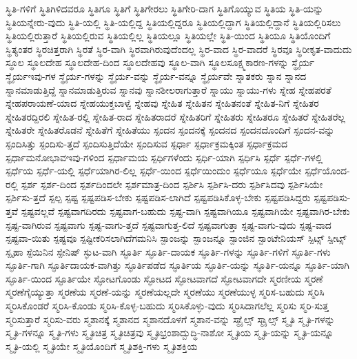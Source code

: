 {ಸ್ಥಿತಿ-ಗಳಿಗೆ
ಸ್ಥಿತಿಗಿಳಿದವರೂ
ಸ್ಥಿತಿಗೂ
ಸ್ಥಿತಿಗೆ
ಸ್ಥಿತಿಗೇರಲು
ಸ್ಥಿತಿಗೇರಿ-ದಾಗ
ಸ್ಥಿತಿಗೊಯ್ಯುವ
ಸ್ಥಿತಿಯ
ಸ್ಥಿತಿ-ಯನ್ನು
ಸ್ಥಿತಿಯನ್ನೇರು-ವುದು
ಸ್ಥಿತಿ-ಯಲ್ಲಿ
ಸ್ಥಿತಿ-ಯಲ್ಲಿದ್ದ
ಸ್ಥಿತಿಯಲ್ಲಿದ್ದರೂ
ಸ್ಥಿತಿಯಲ್ಲಿದ್ದಾಗ
ಸ್ಥಿತಿಯಲ್ಲಿದ್ದಾನೆ
ಸ್ಥಿತಿಯಲ್ಲಿರಿಸಲು
ಸ್ಥಿತಿಯಲ್ಲಿರುತ್ತಾರೆ
ಸ್ಥಿತಿಯಲ್ಲಿರುವ
ಸ್ಥಿತಿಯಲ್ಲಿಲ್ಲ
ಸ್ಥಿತಿಯಲ್ಲೂ
ಸ್ಥಿತಿಯಲ್ಲೇ
ಸ್ಥಿತಿ-ಯಿಂದ
ಸ್ಥಿತಿಯೂ
ಸ್ಥಿತಿಯೊಂದಿಗೆ
ಸ್ಥಿತ್ಯಂತರ
ಸ್ಥಿರಚಿತ್ತರಾಗಿ
ಸ್ಥಿರತೆ
ಸ್ಥಿರ-ವಾಗಿ
ಸ್ಥಿರವಾಗಿರುವುದೆಂದಲ್ಲ
ಸ್ಥಿರ-ವಾದ
ಸ್ಥಿರ-ವಾದರೆ
ಸ್ಥಿರವೂ
ಸ್ಥಿರೀಕೃತ-ವಾದುದು
ಸ್ಥೂಲ
ಸ್ಥೂಲದೇಹ
ಸ್ಥೂಲದೇಹ-ದಿಂದ
ಸ್ಥೂಲದೇಹವು
ಸ್ಥೂಲ-ವಾಗಿ
ಸ್ಥೂಲಸೂಕ್ಷ್ಮಕಾರಣ-ಗಳನ್ನು
ಸ್ಥೈರ್ಯ
ಸ್ಥೈರ್ಯಇವು-ಗಳ
ಸ್ಥೈರ್ಯ-ಗಳನ್ನು
ಸ್ಥೈರ್ಯ-ವನ್ನು
ಸ್ಥೈರ್ಯ-ವನ್ನೂ
ಸ್ಥೈರ್ಯವೇ
ಸ್ನಾತಕರು
ಸ್ನಾನ
ಸ್ನಾನದ
ಸ್ನಾನಮಾಡುತ್ತಿದ್ದೆ
ಸ್ನಾನಮಾಡುತ್ತಿರುವ
ಸ್ನಾನವು
ಸ್ನಾನಶೀಲರಾಗುತ್ತಾರೆ
ಸ್ನಾಯು
ಸ್ನಾಯು-ಗಳು
ಸ್ನೇಹ
ಸ್ನೇಹಪರತೆ
ಸ್ನೇಹಪರಾಯಣೆ-ಯಾದ
ಸ್ನೇಹಯುಕ್ತಬಾಳ್ವೆ
ಸ್ನೇಹವು
ಸ್ನೇಹಿತ
ಸ್ನೇಹಿತನ
ಸ್ನೇಹಿತನಂತೆ
ಸ್ನೇಹಿತ-ನಿಗೆ
ಸ್ನೇಹಿತರ
ಸ್ನೇಹಿತರದ್ದಿರಲಿ
ಸ್ನೇಹಿತ-ರಲ್ಲಿ
ಸ್ನೇಹಿತ-ರಾದ
ಸ್ನೇಹಿತರಾದರೆ
ಸ್ನೇಹಿತರಿಗೆ
ಸ್ನೇಹಿತರು
ಸ್ನೇಹಿತರೂ
ಸ್ನೇಹಿತರೆ
ಸ್ನೇಹಿತರೆಲ್ಲ
ಸ್ನೇಹಿತರೇ
ಸ್ನೇಹಿತರೊಡನೆ
ಸ್ನೇಹಿತೆಗೆ
ಸ್ನೇಹಿತೆಯು
ಸ್ಪಂದನ
ಸ್ಪಂದನಕ್ಕೆ
ಸ್ಪಂದನದ
ಸ್ಪಂದನದೊಂದಿಗೆ
ಸ್ಪಂದನ-ವನ್ನು
ಸ್ಪಂದಿಸಿತ್ತು
ಸ್ಪಂದಿಸು-ತ್ತದೆ
ಸ್ಪಂದಿಸುತ್ತಿದೆಯೇ
ಸ್ಪಂದಿಸುವ
ಸ್ಪರ್ಧಾ
ಸ್ಪರ್ಧಾಕ್ರಮಕ್ಕಿಂತ
ಸ್ಪರ್ಧಾಕ್ರಮದ
ಸ್ಪರ್ಧಾಮನೋಭಾವಇವು-ಗಳಿಂದ
ಸ್ಪರ್ಧಾಮಯ
ಸ್ಪರ್ಧಿಗಳೆಂದು
ಸ್ಪರ್ಧಿ-ಯಾಗಿ
ಸ್ಪರ್ಧಿಸಿ
ಸ್ಪರ್ಧೆ
ಸ್ಪರ್ಧೆ-ಗಳಲ್ಲಿ
ಸ್ಪರ್ಧೆಯ
ಸ್ಪರ್ಧೆ-ಯಲ್ಲಿ
ಸ್ಪರ್ಧೆಯಾಗಿರ-ಲಿಲ್ಲ
ಸ್ಪರ್ಧೆ-ಯಿಂದ
ಸ್ಪರ್ಧೆಯಿಂದುಂ
ಸ್ಪರ್ಧೆಯೂ
ಸ್ಪರ್ಧೆಯೇ
ಸ್ಪರ್ಧೆಯೊಂದ-ರಲ್ಲಿ
ಸ್ಪರ್ಶ
ಸ್ಪರ್ಶ-ದಿಂದ
ಸ್ಪರ್ಶದಿಂದಲೇ
ಸ್ಪರ್ಶಮಾತ್ರ-ದಿಂದ
ಸ್ಪರ್ಶಿಸಿ
ಸ್ಪರ್ಶಿಸಿ-ದರು
ಸ್ಪರ್ಶಿಸಿದವು
ಸ್ಪರ್ಶಿಸಿಯೇ
ಸ್ಪರ್ಶಿಸು-ತ್ತದೆ
ಸ್ಪಲ್ಪ
ಸ್ಪಷ್ಟ
ಸ್ಪಷ್ಟಪಡಿಸ-ಬೇಕು
ಸ್ಪಷ್ಟಪಡಿಸ-ಲಾಗಿದೆ
ಸ್ಪಷ್ಟಪಡಿಸಿಕೊಳ್ಳ-ಬೇಕು
ಸ್ಪಷ್ಟಪಡಿಸಿದ್ದರು
ಸ್ಪಷ್ಟಪಡಿಸು-ತ್ತವೆ
ಸ್ಪಷ್ಟವಲ್ಲವೆ
ಸ್ಪಷ್ಟವಾಗದಿರದು
ಸ್ಪಷ್ಟವಾಗ-ಬಹುದು
ಸ್ಪಷ್ಟ-ವಾಗಿ
ಸ್ಪಷ್ಟವಾಗಿಯೂ
ಸ್ಪಷ್ಟವಾಗಿಯೇ
ಸ್ಪಷ್ಟವಾಗಿರ-ಬೇಕು
ಸ್ಪಷ್ಟ-ವಾಗಿರುವ
ಸ್ಪಷ್ಟವಾಗು
ಸ್ಪಷ್ಟ-ವಾಗು-ತ್ತದೆ
ಸ್ಪಷ್ಟವಾಗುತ್ತ-ಲಿದೆ
ಸ್ಪಷ್ಟವಾಗುತ್ತಾ
ಸ್ಪಷ್ಟ-ವಾಗು-ವುದು
ಸ್ಪಷ್ಟ-ವಾದ
ಸ್ಪಷ್ಟವಾ-ಯಿತು
ಸ್ಪಷ್ಟವೂ
ಸ್ಪಷ್ಟೀಕರಿಸಲಾಗಿದೆಗಮನಿಸಿ
ಸ್ಪಾಂಜನ್ನು
ಸ್ಪಾಂಜನ್ನೂ
ಸ್ಪಾಂಜಿನ
ಸ್ಪಾಂಟೇನಿಯಸ್
ಸ್ಪಿಟ್ಸ್
ಸ್ಪೀಟ್ಸ್
ಸ್ಪೃಹಾ
ಸ್ಪೆಯಿನಿನ
ಸ್ಪೇನಿಷ್
ಸ್ಫುಟ-ವಾಗಿ
ಸ್ಫೂರ್ತಿ
ಸ್ಫೂರ್ತಿ-ದಾಯಕ
ಸ್ಫೂರ್ತಿ-ಗಳನ್ನು
ಸ್ಫೂರ್ತಿ-ಗಳಿಗೆ
ಸ್ಫೂರ್ತಿ-ಗಳು
ಸ್ಫೂರ್ತಿ-ಗಾಗಿ
ಸ್ಫೂರ್ತಿದಾಯಕ-ವಾಗಿತ್ತು
ಸ್ಫೂರ್ತಿಪಡೆದ
ಸ್ಫೂರ್ತಿಯ
ಸ್ಫೂರ್ತಿ-ಯನ್ನು
ಸ್ಫೂರ್ತಿ-ಯನ್ನೂ
ಸ್ಫೂರ್ತಿ-ಯಾಗಿ
ಸ್ಫೂರ್ತಿ-ಯಿಂದ
ಸ್ಫೂರ್ತಿಯೇ
ಸ್ಫೋಟಗೊಂಡು
ಸ್ಫೋಟದ
ಸ್ಫೋಟವಾಗದೆ
ಸ್ಫೋಟವಾಗದೇ
ಸ್ಮರಣೀಯ
ಸ್ಮರಣೆ
ಸ್ಮರಣೆಗೈಯ್ಯುತ್ತಾ
ಸ್ಮರಣೆಯ
ಸ್ಮರಣೆ-ಯನ್ನು
ಸ್ಮರಣೆಯಲ್ಲದೇ
ಸ್ಮರಣೆಯು
ಸ್ಮರಣೆಯುಳ್ಳ
ಸ್ಮರಿಸ-ಬಹುದು
ಸ್ಮರಿಸಿ
ಸ್ಮರಿಸಿಕೊಂಡರೆ
ಸ್ಮರಿಸಿ-ಕೊಂಡು
ಸ್ಮರಿಸಿ-ಕೊಳ್ಳ-ಬಹುದು
ಸ್ಮರಿಸಿಕೊಳ್ಳು-ವುದು
ಸ್ಮರಿಸಿದಾಗಲೆಲ್ಲ
ಸ್ಮರಿಸು
ಸ್ಮರಿ-ಸುತ್ತ
ಸ್ಮರಿಸುತ್ತಾರೆ
ಸ್ಮರಿಸು-ವರು
ಸ್ಮಶಾನಕ್ಕೆ
ಸ್ಮಶಾನದ
ಸ್ಮಶಾನದೊಳಗೆ
ಸ್ಮಶಾನ-ವನ್ನು
ಸ್ಮಾೈಲ್ಸ್
ಸ್ಮಾೖಲ್ಸ್
ಸ್ಮೃತಿ
ಸ್ಮೃತಿ-ಗಳನ್ನು
ಸ್ಮೃತಿ-ಗಳನ್ನೂ
ಸ್ಮೃತಿ-ಗಳು
ಸ್ಮೃತಿಚಿತ್ರ
ಸ್ಮೃತಿಚಿತ್ರವು
ಸ್ಮೃತಿಭ್ರಂಶಾದ್ಬುದ್ಧಿ-ನಾಶೋ
ಸ್ಮೃತಿಯ
ಸ್ಮೃತಿ-ಯನ್ನು
ಸ್ಮೃತಿ-ಯನ್ನೂ
ಸ್ಮೃತಿ-ಯಲ್ಲಿ
ಸ್ಮೃತಿಯೇ
ಸ್ಮೃತಿಯೊಂದಿಗೆ
ಸ್ಮೃತಿಶಕ್ತಿ-ಗಳು
ಸ್ಮೃತಿಶಕ್ತಿಯ
}
